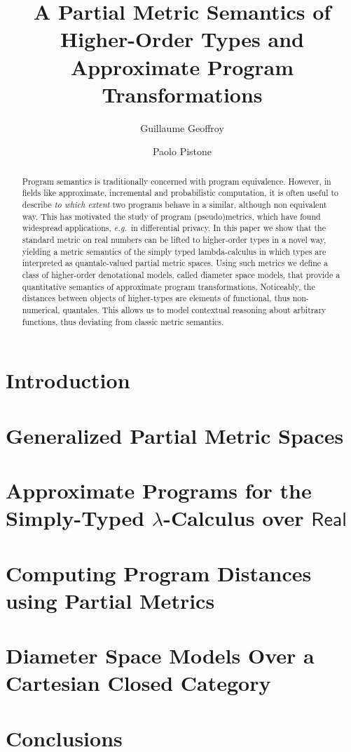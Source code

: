 \documentclass[a4paper,USenglish,cleveref, autoref, thm-restate]{lipics-v2019}
\title{A Partial Metric Semantics of Higher-Order Types and Approximate Program Transformations}
\author{Guillaume Geoffroy}
{Universit\`a di Bologna, Dipartimento Informatica, Scienza e Ingegneria, Italy}
{guillaume.geoffroy@unibo.it} 
{}
{ERC CoG 818616 “DIAPASoN”, ANR 16CE250011 “REPAS”}
\author{Paolo Pistone}
{Universit\`a di Bologna, Dipartimento Informatica, Scienza e Ingegneria, Italy}
{paolo.pistone2@unibo.it} 
{}
{ERC CoG 818616 “DIAPASoN”, ANR 16CE250011 “REPAS”}
\begin{document}
\maketitle

\begin{abstract}
Program semantics is traditionally concerned with program equivalence. However, in fields like approximate, incremental and probabilistic computation, it is often useful to describe \emph{to which extent} two programs behave in a similar, although non equivalent way. This has motivated the study of program (pseudo)metrics, which have found widespread applications, \emph{e.g.}~in differential privacy. 
In this paper we show that the standard metric on real numbers can be lifted to higher-order types in a novel way, yielding a metric semantics of the simply typed lambda-calculus in which types are interpreted as quantale-valued partial metric spaces. Using such metrics we define a class of higher-order denotational models, called diameter space models, that provide a quantitative semantics of approximate program transformations.
Noticeably, the distances between objects of higher-types are elements of functional, thus non-numerical, quantales. This allows us to model contextual reasoning about arbitrary functions, thus deviating from classic metric semantics.
\end{abstract}

\section{Introduction}




\section{Generalized Partial Metric Spaces}



\section{Approximate Programs for the Simply-Typed $\lambda$-Calculus over $\mathsf{Real}$}
\label{section:stlc}



\section{Computing Program Distances using Partial Metrics}



\section{Diameter Space Models Over a Cartesian Closed Category}



\section{Conclusions}





%
%
\end{document}
